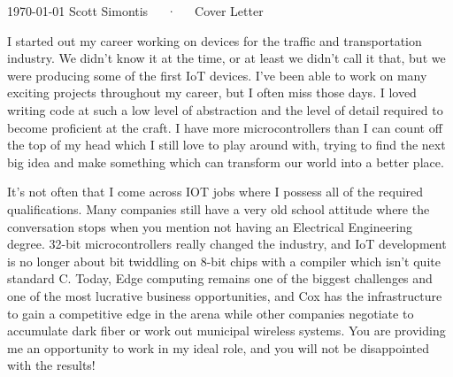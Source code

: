 \documentclass[11pt, letterpaper]{awesome-cv}
\begin{document}
\makecvheader[R]

\makecvfooter
  {\today}
  {Scott Simontis~~~·~~~Cover Letter}
  {}

\makelettertitle

\begin{cvletter}

I started out my career working on devices for the traffic and transportation industry. We didn't know it at the time, or at least we didn't call it that, but we were producing some of the first IoT devices. I've been able to work on many exciting projects throughout my career, but I often miss those days. I loved writing code at such a low level of abstraction and the level of detail required to become proficient at the craft. I have more microcontrollers than I can count off the top of my head which I still love to play around with, trying to find the next big idea and make something which can transform our world into a better place.

It's not often that I come across IOT jobs where I possess all of the required qualifications. Many companies still have a very old school attitude where the conversation stops when you mention not having an Electrical Engineering degree. 32-bit microcontrollers really changed the industry, and IoT development is no longer about bit twiddling on 8-bit chips with a compiler which isn't quite standard C. Today, Edge computing remains one of the biggest challenges and one of the most lucrative business opportunities, and Cox has the infrastructure to gain a competitive edge in the arena while other companies negotiate to accumulate dark fiber or work out municipal wireless systems. You are providing me an opportunity to work in my ideal role, and you will not be disappointed with the results!


\end{cvletter}
\end{document}
